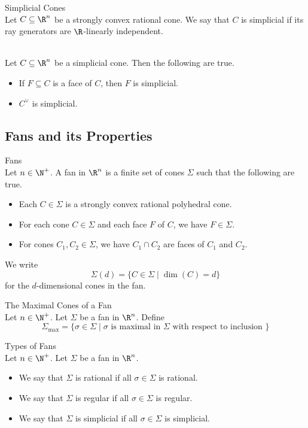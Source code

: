 \documentclass[a4paper]{article}
\begin{document}
\begin{defn}{Simplicial Cones}{}\\
Let $C\subseteq\R^n$ be a strongly convex rational cone. We say that $C$ is simplicial if its ray generators are $\R$-linearly independent. 
\end{defn}

\begin{lmm}{}{}\\
Let $C\subseteq\R^n$ be a simplicial cone. Then the following are true. 
\begin{itemize}
\item If $F\subseteq C$ is a face of $C$, then $F$ is simplicial. 
\item $C^\vee$ is simplicial. 
\end{itemize}
\end{lmm}

\subsection{Fans and its Properties}
\begin{defn}{Fans}{}\\
Let $n\in\N^+$. A fan in $\R^n$ is a finite set of cones $\Sigma$ such that the following are true. 
\begin{itemize}
\item Each $C\in\Sigma$ is a strongly convex rational polyhedral cone. 
\item For each cone $C\in\Sigma$ and each face $F$ of $C$, we have $F\in\Sigma$. 
\item For cones $C_1,C_2\in\Sigma$, we have $C_1\cap C_2$ are faces of $C_1$ and $C_2$. 
\end{itemize}
We write $$\Sigma(d)=\{C\in\Sigma\;|\;\dim(C)=d\}$$ for the $d$-dimensional cones in the fan. 
\end{defn}

\begin{defn}{The Maximal Cones of a Fan}{}\\
Let $n\in\N^+$. Let $\Sigma$ be a fan in $\R^n$. Define $$\Sigma_\text{max}=\{\sigma\in\Sigma\;|\;\sigma\text{ is maximal in }\Sigma\text{ with respect to inclusion }\}$$
\end{defn}

\begin{defn}{Types of Fans}{}\\
Let $n\in\N^+$. Let $\Sigma$ be a fan in $\R^n$. 
\begin{itemize}
\item We say that $\Sigma$ is rational if all $\sigma\in\Sigma$ is rational. 
\item We say that $\Sigma$ is regular if all $\sigma\in\Sigma$ is regular. 
\item We say that $\Sigma$ is simplicial if all $\sigma\in\Sigma$ is simplicial. 
\end{itemize}
\end{defn}
\end{document}

